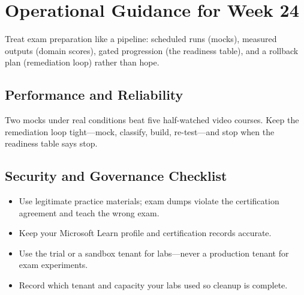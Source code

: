 \section{Operational Guidance for Week 24}
Treat exam preparation like a pipeline: scheduled runs (mocks), measured outputs (domain scores), gated progression (the readiness table), and a rollback plan (remediation loop) rather than hope.

\subsection{Performance and Reliability}
Two mocks under real conditions beat five half-watched video courses. Keep the remediation loop tight---mock, classify, build, re-test---and stop when the readiness table says stop.

\subsection{Security and Governance Checklist}
\begin{itemize}
    \item Use legitimate practice materials; exam dumps violate the certification agreement and teach the wrong exam.
    \item Keep your Microsoft Learn profile and certification records accurate.
    \item Use the trial or a sandbox tenant for labs---never a production tenant for exam experiments.
    \item Record which tenant and capacity your labs used so cleanup is complete.
\end{itemize}

